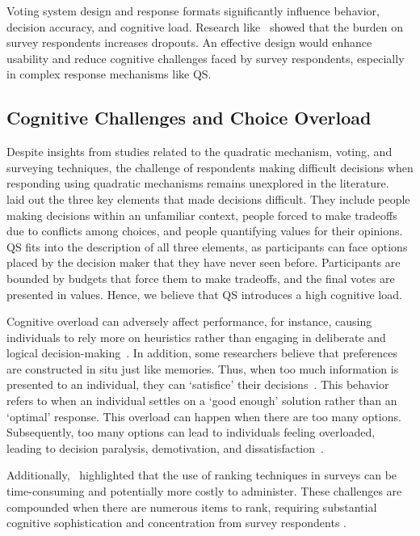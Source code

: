 Voting system design and response formats significantly influence behavior, decision accuracy, and cognitive load. Research like~\textcite{galesicDropoutsWebEffects2006} showed that the burden on survey respondents increases dropouts. An effective design would enhance usability and reduce cognitive challenges faced by survey respondents, especially in complex response mechanisms like QS.

\subsection{Cognitive Challenges and Choice Overload}
Despite insights from studies related to the quadratic mechanism, voting, and surveying techniques, the challenge of respondents making difficult decisions when responding using quadratic mechanisms remains unexplored in the literature.~\textcite{lichtensteinConstructionPreference2006} laid out the three key elements that made decisions difficult. They include people making decisions within an unfamiliar context, people forced to make tradeoffs due to conflicts among choices, and people quantifying values for their opinions. QS fits into the description of all three elements, as participants can face options placed by the decision maker that they have never seen before. Participants are bounded by budgets that force them to make tradeoffs, and the final votes are presented in values. Hence, we believe that QS introduces a high cognitive load.

Cognitive overload can adversely affect performance, for instance, causing individuals to rely more on heuristics rather than engaging in deliberate and logical decision-making~\cite{daniel2017thinking}. In addition, some researchers believe that preferences are constructed in situ just like memories. Thus, when too much information is presented to an individual, they can `satisfice' their decisions~\cite{simonBehavioralModelRational1955, payneAdaptiveStrategySelection1988, tverskyJudgmentsRepresentativeness}. This behavior refers to when an individual settles on a `good enough' solution rather than an `optimal' response. This overload can happen when there are too many options. Subsequently, too many options can lead to individuals feeling overloaded, leading to decision paralysis, demotivation, and dissatisfaction~\cite{iyengarWhenChoiceDemotivating2000}.

Additionally,~\textcite{alwinMeasurementValuesSurveys1985} highlighted that the use of ranking techniques in surveys can be time-consuming and potentially more costly to administer. These challenges are compounded when there are numerous items to rank, requiring substantial cognitive sophistication and concentration from survey respondents \cite{featherMeasurementValuesEffects1973}.

